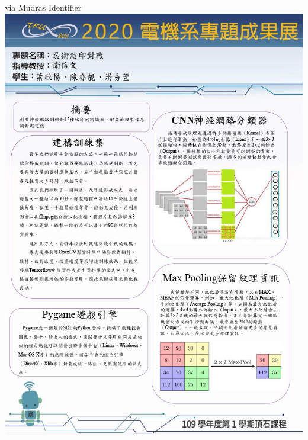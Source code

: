 \begin{cventries}
  \cventry
    {via Mudras Identifier\linebreak[1]\includegraphics[scale=0.2, left]{naruto-battle.jpg}}
    {\href{https://github.com/chencyutku/Naruto-Battle-GUI}{\color{hyperlink}{Naruto-Battle game(link)}}}
    {}{}{}


\end{cventries}
